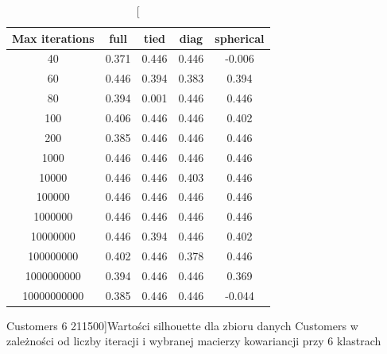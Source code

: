 \documentclass{classrep}
\begin{document}
{{\begin{table}[!htbp]
                \begin{minipage}{1\textwidth}
                \centering
                \begin{tabular}{|c|c|c|c|c|}
                \hline
                Max iterations & full & tied & diag & spherical \\ \hline
                40 & 0.371 & 0.446 & 0.446 & -0.006 \\ \hline
                60 & 0.446 & 0.394 & 0.383 & 0.394 \\ \hline
                80 & 0.394 & 0.001 & 0.446 & 0.446 \\ \hline
                100 & 0.406 & 0.446 & 0.446 & 0.402 \\ \hline
                200 & 0.385 & 0.446 & 0.446 & 0.446 \\ \hline
                1000 & 0.446 & 0.446 & 0.446 & 0.446 \\ \hline
                10000 & 0.446 & 0.446 & 0.403 & 0.446 \\ \hline
                100000 & 0.446 & 0.446 & 0.446 & 0.446 \\ \hline
                1000000 & 0.446 & 0.446 & 0.446 & 0.446 \\ \hline
                10000000 & 0.446 & 0.394 & 0.446 & 0.402 \\ \hline
                100000000 & 0.402 & 0.446 & 0.378 & 0.446 \\ \hline
                1000000000 & 0.394 & 0.446 & 0.446 & 0.369 \\ \hline
                10000000000 & 0.385 & 0.446 & 0.446 & -0.044 \\ \hline
                \end{tabular}
                \caption
                [Customers 6 211500]{Wartości silhouette dla zbioru danych Customers w zależności od liczby iteracji i wybranej macierzy kowariancji przy 6 klastrach}
                \label{Customers_6_211500}
                \end{minipage}
                \hfill


\end{table}}}
\end{document}
